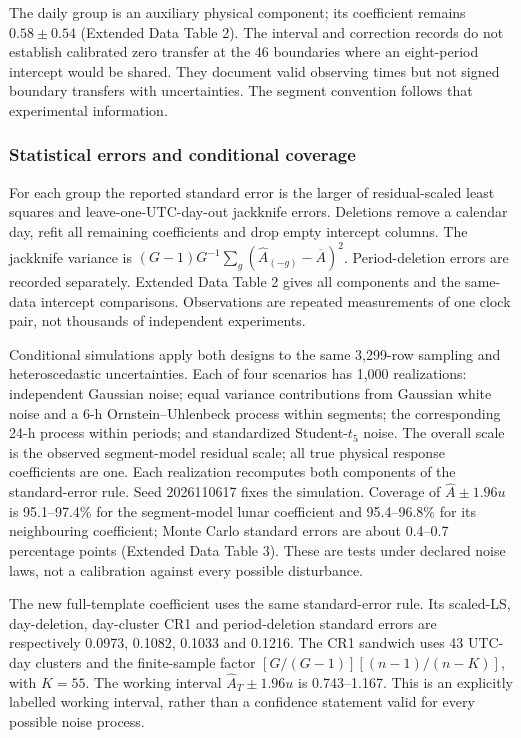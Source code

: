 \documentclass[
  12pt,
  a4paper,
]{article}
\begin{document}
The daily group is an auxiliary physical component; its coefficient
remains \(0.58\pm0.54\) (Extended Data Table 2). The interval and
correction records do not establish calibrated zero transfer at the 46
boundaries where an eight-period intercept would be shared. They
document valid observing times but not signed boundary transfers with
uncertainties. The segment convention follows that experimental
information.

\hypertarget{statistical-errors-and-conditional-coverage}{%
\subsubsection{Statistical errors and conditional
coverage}\label{statistical-errors-and-conditional-coverage}}

For each group the reported standard error is the larger of
residual-scaled least squares and leave-one-UTC-day-out jackknife
errors. Deletions remove a calendar day, refit all remaining
coefficients and drop empty intercept columns. The jackknife variance is
\((G-1)G^{-1}\sum_g(\hat A_{(-g)}-\overline A)^2\). Period-deletion
errors are recorded separately. Extended Data Table 2 gives all
components and the same-data intercept comparisons. Observations are
repeated measurements of one clock pair, not thousands of independent
experiments.

Conditional simulations apply both designs to the same 3,299-row
sampling and heteroscedastic uncertainties. Each of four scenarios has
1,000 realizations: independent Gaussian noise; equal variance
contributions from Gaussian white noise and a 6-h Ornstein--Uhlenbeck
process within segments; the corresponding 24-h process within periods;
and standardized Student-\(t_5\) noise. The overall scale is the
observed segment-model residual scale; all true physical response
coefficients are one. Each realization recomputes both components of the
standard-error rule. Seed 2026110617 fixes the simulation. Coverage of
\(\hat A\pm1.96u\) is 95.1--97.4\% for the segment-model lunar
coefficient and 95.4--96.8\% for its neighbouring coefficient; Monte
Carlo standard errors are about 0.4--0.7 percentage points (Extended
Data Table 3). These are tests under declared noise laws, not a
calibration against every possible disturbance.

The new full-template coefficient uses the same standard-error rule. Its
scaled-LS, day-deletion, day-cluster CR1 and period-deletion standard
errors are respectively 0.0973, 0.1082, 0.1033 and 0.1216. The CR1
sandwich uses 43 UTC-day clusters and the finite-sample factor
\([G/(G-1)][(n-1)/(n-K)]\), with \(K=55\). The working interval
\(\widehat A_T\pm1.96u\) is 0.743--1.167. This is an explicitly labelled
working interval, rather than a confidence statement valid for every
possible noise process.
\end{document}
